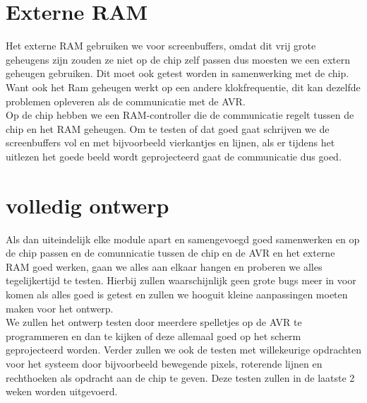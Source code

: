 \documentclass{scrartcl} %
\begin{document}
\section{Externe RAM}

Het externe RAM gebruiken we voor screenbuffers, omdat dit vrij grote geheugens zijn zouden ze niet op de chip zelf passen dus moesten we een extern geheugen gebruiken. Dit moet ook getest worden in samenwerking met de chip. Want ook het Ram 
geheugen werkt op een andere klokfrequentie, dit kan dezelfde problemen opleveren als de communicatie met de AVR.\\ Op de chip hebben we een RAM-controller die de communicatie regelt tussen de chip en het RAM geheugen. Om te testen of dat goed gaat schrijven
we de screenbuffers vol en met bijvoorbeeld vierkantjes en lijnen, als er tijdens het uitlezen het goede beeld wordt geprojecteerd gaat de communicatie dus goed.


\section{volledig ontwerp}

Als dan uiteindelijk elke module apart en samengevoegd goed samenwerken en op de chip passen en de comunnicatie tussen de chip en de AVR en het externe RAM goed werken, gaan we alles aan elkaar hangen en proberen we alles tegelijkertijd te testen. 
Hierbij zullen waarschijnlijk geen grote bugs meer in voor komen als alles goed is getest en zullen we hooguit kleine aanpassingen moeten maken voor het ontwerp.\\ We zullen het ontwerp testen door meerdere spelletjes op de AVR te programmeren en dan te kijken 
of deze allemaal goed op het scherm geprojecteerd worden. Verder zullen we ook de testen met willekeurige opdrachten voor het systeem door bijvoorbeeld bewegende pixels, roterende lijnen en rechthoeken als opdracht aan de chip te geven. Deze testen zullen in de laatste 2 weken worden uitgevoerd.
\end{document}
